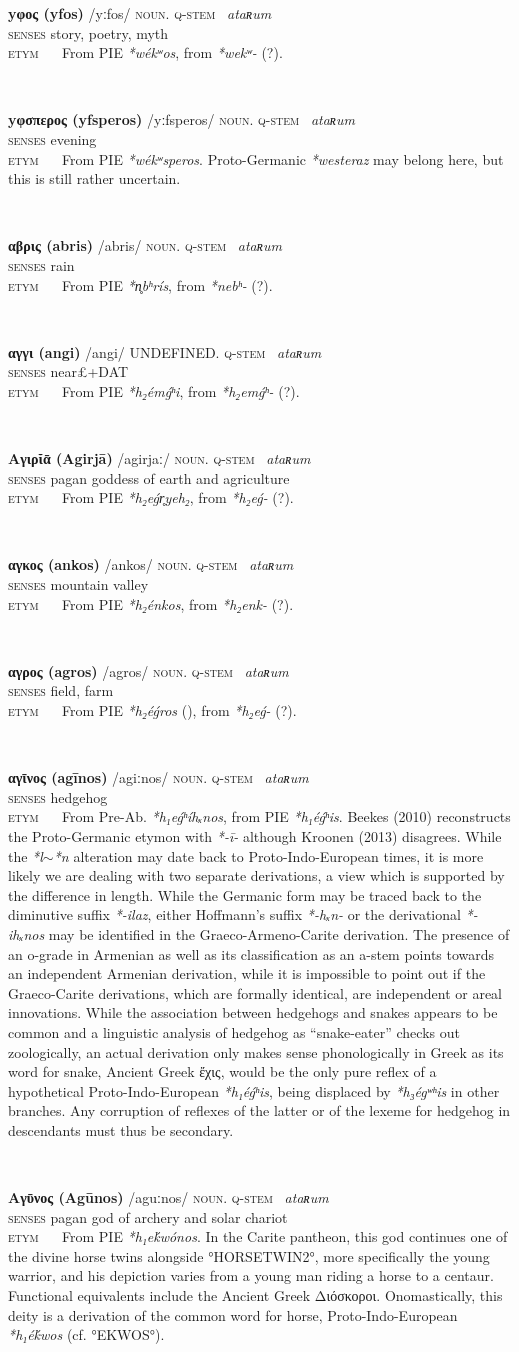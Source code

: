 \documentclass[svgnames,x11names,b5paper]{book}
\newcommand{\dictentry}[7]{

\begin{minipage}{\textwidth}
\textbf{#1} \quad{} {/}{#2}{/} \quad{} \textsc{#3}. \quad{} \textsc{#4} ~\textit{#5} \\\vspace{4pt}
\textsc{senses} #6 \\\vspace{-2pt}
\textsc{etym} ~~ #7
\end{minipage}\\\vspace{8pt}

}
\begin{document}
\dictentry{yφος (yfos)}{yːfos}{noun}{q-stem}{ataʀum}{story, poetry, myth}{From PIE \textit{*wékʷos}, from \textit{*wekʷ-} (?).}
\dictentry{yφσπερος (yfsperos)}{yːfsperos}{noun}{q-stem}{ataʀum}{evening}{From PIE \textit{*wékʷsperos}. Proto-Germanic \textit{*westeraz} may belong here, but this is still rather uncertain.}
\dictentry{αβρις (abris)}{abris}{noun}{q-stem}{ataʀum}{rain}{From PIE \textit{*n̥bʰrís}, from \textit{*nebʰ-} (?).}
\dictentry{αγγι (angi)}{angi}{UNDEFINED}{q-stem}{ataʀum}{near£+DAT}{From PIE \textit{*h₂émǵʰi}, from \textit{*h₂emǵʰ-} (?).}
\dictentry{Αγιρῐᾱ (Agirjā)}{agirjaː}{noun}{q-stem}{ataʀum}{pagan goddess of earth and agriculture}{From PIE \textit{*h₂eǵr̥yeh₂}, from \textit{*h₂eǵ-} (?).}
\dictentry{αγκος (ankos)}{ankos}{noun}{q-stem}{ataʀum}{mountain valley}{From PIE \textit{*h₂énkos}, from \textit{*h₂enk-} (?).}
\dictentry{αγρος (agros)}{agros}{noun}{q-stem}{ataʀum}{field, farm}{From PIE \textit{*h₂éǵros} (), from \textit{*h₂eǵ-} (?).}
\dictentry{αγῑνος (agīnos)}{agiːnos}{noun}{q-stem}{ataʀum}{hedgehog}{From Pre-Ab. \textit{*h₁eǵʰíhₓnos}, from PIE \textit{*h₁éǵʰis}. Beekes (2010) reconstructs the Proto-Germanic etymon with \textit{*-ī-} although Kroonen (2013) disagrees. While the \textit{*l$\sim$*n} alteration may date back to Proto-Indo-European times, it is more likely we are dealing with two separate derivations, a view which is supported by the difference in length. While the Germanic form may be traced back to the diminutive suffix \textit{*-ilaz}, either Hoffmann's suffix \textit{*-hₓn-} or the derivational \textit{*-ihₓnos} may be identified in the Graeco-Armeno-Carite derivation. The presence of an o-grade in Armenian as well as its classification as an a-stem points towards an independent Armenian derivation, while it is impossible to point out if the Graeco-Carite derivations, which are formally identical, are independent or areal innovations. While the association between hedgehogs and snakes appears to be common and a linguistic analysis of hedgehog as “snake-eater” checks out zoologically, an actual derivation only makes sense phonologically in Greek as its word for snake, Ancient Greek ἔχις, would be the only pure reflex of a hypothetical Proto-Indo-European \textit{*h₁éǵʰis}, being displaced by  \textit{*h₃égʷʰis} in other branches. Any corruption of reflexes of the latter or of the lexeme for hedgehog in descendants must thus be secondary.}
\dictentry{Αγῡνος (Agūnos)}{aguːnos}{noun}{q-stem}{ataʀum}{pagan god of archery and solar chariot}{From PIE \textit{*h₁eḱwónos}. In the Carite pantheon, this god continues one of the divine horse twins alongside °HORSETWIN2°, more specifically the young warrior, and his depiction varies from a young man riding a horse to a centaur. Functional equivalents include the Ancient Greek Διόσκοροι. Onomastically, this deity is a derivation of the common word for horse, Proto-Indo-European \textit{*h₁éḱwos} (cf. °EKWOS°).}
\end{document}
